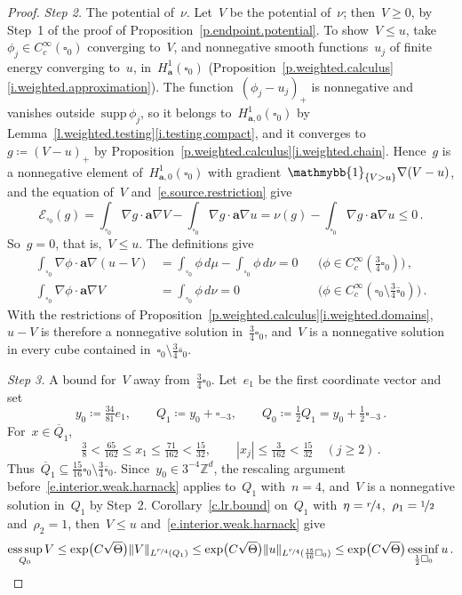 \documentclass[11pt,letterpaper]{article}
\numberwithin{equation}{section}
\theoremstyle{definition}
\newcommand{\Zd}{\mathbb{Z}^d}
\renewcommand{\a}{\mathbf{a}}
\newcommand{\nf}{\nicefrac}
\newcommand{\cu}{\square}
\newcommand*{\supp}{\mathrm{supp\,}}
\DeclareMathOperator*{\esssup}{ess\,sup}
\DeclareMathOperator*{\essinf}{ess\,inf}
\DeclarePairedDelimiter{\norm}{\lVert}{\rVert}
\renewcommand{\subset}{\subseteq}
\newcommand{\indc}{{\mathmybb{1}}}
\newcommand{\Ener}{\mathcal E}
\newcommand{\Hzero}[1]{H^1_{#1,0}}
\begin{document}
\begin{proof}
\smallskip

\emph{Step 2.} The potential of~$\nu$. Let~$V$ be the potential of~$\nu$; then~$V\geq0$, by Step~1 of the proof of Proposition~\ref{p.endpoint.potential}. To show~$V\leq u$, take~$\phi_j\in C^\infty_c(\cu_0)$ converging to~$V$, and nonnegative smooth functions~$u_j$ of finite energy converging to~$u$, in~$H^1_\a(\cu_0)$ (Proposition~\ref{p.weighted.calculus}\ref{i.weighted.approximation}). The function~$(\phi_j-u_j)_+$ is nonnegative and vanishes outside~$\supp\phi_j$, so it belongs to~$\Hzero{\a}(\cu_0)$ by Lemma~\ref{l.weighted.testing}\ref{i.testing.compact}, and it converges to~$g\coloneqq(V-u)_+$ by Proposition~\ref{p.weighted.calculus}\ref{i.weighted.chain}. Hence~$g$ is a nonnegative element of~$\Hzero{\a}(\cu_0)$ with gradient~$\indc_{\{V>u\}}\nabla(V-u)$, and the equation of~$V$ and~\eqref{e.source.restriction} give
\begin{equation*}
	\Ener_{\cu_0}(g)=\int_{\cu_0}\nabla g\cdot\a\nabla V-\int_{\cu_0}\nabla g\cdot\a\nabla u=\nu(g)-\int_{\cu_0}\nabla g\cdot\a\nabla u\leq0\,.
\end{equation*}
So~$g=0$, that is,~$V\leq u$. The definitions give
\begin{align*}
	\int_{\cu_0}\nabla\phi\cdot\a\nabla(u-V)&=\int_{\cu_0}\phi\,d\mu-\int_{\cu_0}\phi\,d\nu=0&&\bigl(\phi\in C^\infty_c(\tfrac34\cu_0)\bigr)\,,\\
	\int_{\cu_0}\nabla\phi\cdot\a\nabla V&=\int_{\cu_0}\phi\,d\nu=0&&\bigl(\phi\in C^\infty_c(\cu_0\setminus\tfrac34\overline{\cu}_0)\bigr)\,.
\end{align*}
With the restrictions of Proposition~\ref{p.weighted.calculus}\ref{i.weighted.domains},~$u-V$ is therefore a nonnegative solution in~$\frac34\cu_0$, and~$V$ is a nonnegative solution in every cube contained in~$\cu_0\setminus\frac34\overline{\cu}_0$.

\smallskip

\emph{Step 3.} A bound for~$V$ away from~$\frac34\cu_0$. Let~$e_1$ be the first coordinate vector and set
\begin{equation*}
	y_0\coloneqq\tfrac{34}{81}e_1,\qquad Q_1\coloneqq y_0+\cu_{-3},\qquad Q_0\coloneqq\tfrac12Q_1=y_0+\tfrac12\cu_{-3}\,.
\end{equation*}
For~$x\in\overline Q_1$,
\begin{equation*}
	\tfrac38<\tfrac{65}{162}\leq x_1\leq\tfrac{71}{162}<\tfrac{15}{32},\qquad |x_j|\leq\tfrac3{162}<\tfrac{15}{32}\quad(j\geq2)\,.
\end{equation*}
Thus~$\overline Q_1\subset\frac{15}{16}\cu_0\setminus\frac34\overline{\cu}_0$. Since~$y_0\in3^{-4}\Zd$, the rescaling argument before~\eqref{e.interior.weak.harnack} applies to~$Q_1$ with~$n=4$, and~$V$ is a nonnegative solution in~$Q_1$ by Step~2. Corollary~\ref{c.lr.bound} on~$Q_1$ with~$\eta=\nf r4$,~$\rho_1=\nf12$ and~$\rho_2=1$, then~$V\leq u$ and~\eqref{e.interior.weak.harnack} give
\begin{equation}
	\esssup_{Q_0}V\leq\exp\bigl(C\sqrt\Theta\bigr)\norm{V}_{L^{\nf r4}(Q_1)}\leq\exp\bigl(C\sqrt\Theta\bigr)\norm{u}_{L^{\nf r4}(\frac{15}{16}\cu_0)}\leq\exp\bigl(C\sqrt\Theta\bigr)\essinf_{\frac12\cu_0}u\,.
	\label{e.remote.bound}
\end{equation}


\end{proof}
\end{document}
